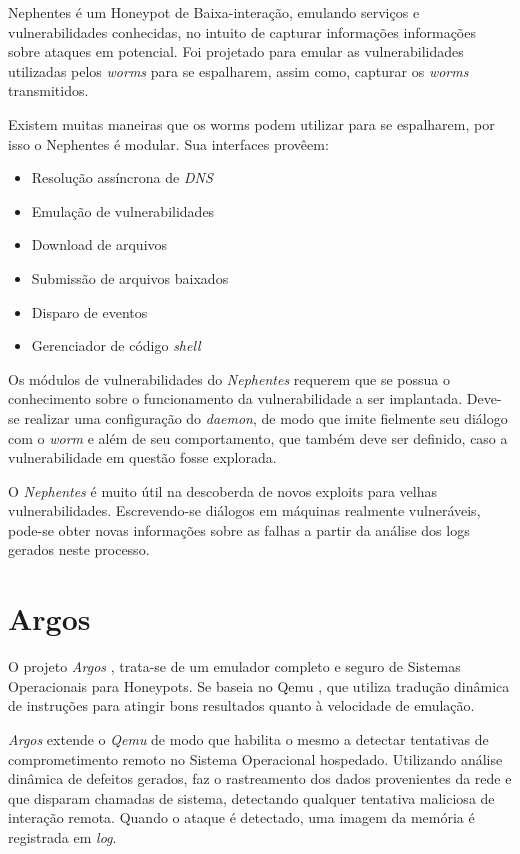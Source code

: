 Nephentes \cite{SiteNephentes} é um Honeypot de Baixa-interação, emulando serviços e vulnerabilidades conhecidas, no intuito de capturar informações informações sobre ataques em potencial. Foi projetado para emular as vulnerabilidades utilizadas pelos \textit{worms} para se espalharem, assim como, capturar os \textit{worms} transmitidos.

Existem muitas maneiras que os worms podem utilizar para se espalharem, por isso o Nephentes é modular. Sua interfaces provêem:
\begin{itemize}
    \item Resolução assíncrona de \textit{DNS}
    \item Emulação de vulnerabilidades
    \item Download de arquivos
    \item Submissão de arquivos baixados
    \item Disparo de eventos
    \item Gerenciador de código \textit{shell}
\end{itemize}

Os módulos de vulnerabilidades do \textit{Nephentes} requerem que se possua o conhecimento sobre o funcionamento da vulnerabilidade a ser implantada. Deve-se realizar uma configuração do \textit{daemon}, de modo que imite fielmente seu diálogo com o \textit{worm} e além de seu comportamento, que também deve ser definido, caso a vulnerabilidade em questão fosse explorada.

O \textit{Nephentes} é muito útil na descoberda de novos exploits para velhas vulnerabilidades. Escrevendo-se diálogos em máquinas realmente vulneráveis, pode-se obter novas informações sobre as falhas a partir da análise dos logs gerados neste processo.


\section{Argos}

O projeto \textit{Argos} \cite{SiteArgos}, trata-se de um emulador completo e seguro de Sistemas Operacionais para Honeypots. Se baseia no Qemu \cite{SiteQemu} \cite{QEMU}, que utiliza tradução dinâmica de instruções para atingir bons resultados quanto à velocidade de emulação. \cite{Argos}

\textit{Argos} extende o \textit{Qemu} de modo que habilita o mesmo a detectar tentativas de comprometimento remoto no Sistema Operacional hospedado. Utilizando análise dinâmica de defeitos gerados, faz o rastreamento dos dados provenientes da rede e que disparam chamadas de sistema, detectando qualquer tentativa maliciosa de interação remota. Quando o ataque é detectado, uma imagem da memória é registrada em \textit{log}.

